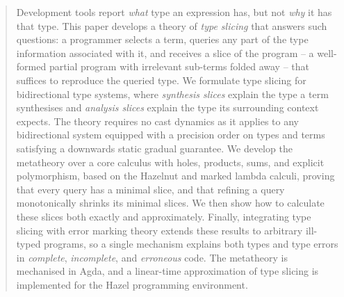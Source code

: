 \begin{abstract}
Development tools report \emph{what} type an expression has, but not \emph{why} it has that type. This paper develops a theory of \emph{type slicing} that answers such questions: a programmer selects a term, queries any part of the type information associated with it, and receives a slice of the program -- a well-formed partial program with irrelevant sub-terms folded away -- that suffices to reproduce the queried type. We formulate type slicing for bidirectional type systems, where \emph{synthesis slices} explain the type a term synthesises and \emph{analysis slices} explain the type its surrounding context expects. The theory requires no cast dynamics as it applies to any bidirectional system equipped with a precision order on types and terms satisfying a downwards static gradual guarantee. We develop the metatheory over a core calculus with holes, products, sums, and explicit polymorphism, based on the Hazelnut and marked lambda calculi, proving that every query has a minimal slice, and that refining a query monotonically shrinks its minimal slices. We then show how to calculate these slices both exactly and approximately. Finally, integrating type slicing with error marking theory extends these results to arbitrary ill-typed programs, so a single mechanism explains both types and type errors in \textit{complete}, \textit{incomplete}, and \textit{erroneous} code. The metatheory is mechanised in Agda, and a linear-time approximation of type slicing is implemented for the Hazel programming environment.
\end{abstract}

